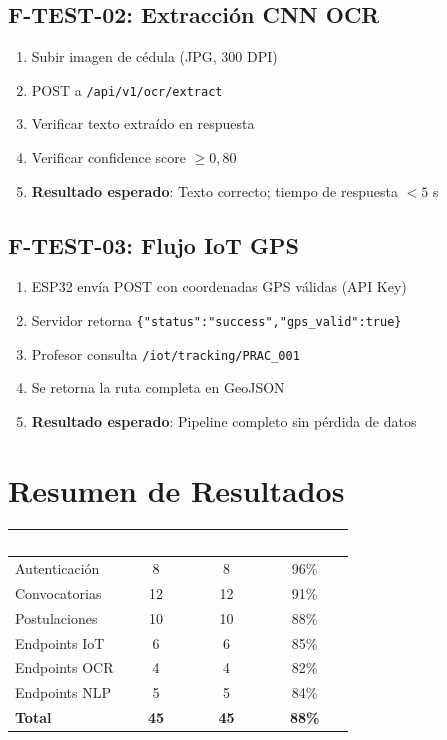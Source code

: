 \documentclass[12pt,a4paper,twoside]{report}
\begin{document}
\subsection{F-TEST-02: Extracción CNN OCR}
\begin{enumerate}[leftmargin=*]
\item Subir imagen de cédula (JPG, 300 DPI)
\item POST a \texttt{/api/v1/ocr/extract}
\item Verificar texto extraído en respuesta
\item Verificar confidence score $\geq 0{,}80$
\item \textbf{Resultado esperado}: Texto correcto; tiempo de respuesta $< 5$ s
\end{enumerate}

\subsection{F-TEST-03: Flujo IoT GPS}
\begin{enumerate}[leftmargin=*]
\item ESP32 envía POST con coordenadas GPS válidas (API Key)
\item Servidor retorna \texttt{\{"status":"success","gps\_valid":true\}}
\item Profesor consulta \texttt{/iot/tracking/PRAC\_001}
\item Se retorna la ruta completa en GeoJSON
\item \textbf{Resultado esperado}: Pipeline completo sin pérdida de datos
\end{enumerate}

\section{Resumen de Resultados}
\begin{center}
\begin{tabularx}{\textwidth}{|l|c|c|c|}
\hline
\rowcolor{tableHdr}
\textcolor{white}{\textbf{Módulo}} & \textcolor{white}{\textbf{Pruebas}} &
\textcolor{white}{\textbf{Pasadas}} & \textcolor{white}{\textbf{Cobertura}} \\
\hline
\rowcolor{rowOdd}Autenticación & 8 & 8 & 96\% \\
\hline\rowcolor{rowEven}Convocatorias & 12 & 12 & 91\% \\
\hline\rowcolor{rowOdd}Postulaciones & 10 & 10 & 88\% \\
\hline\rowcolor{rowEven}Endpoints IoT & 6 & 6 & 85\% \\
\hline\rowcolor{rowOdd}Endpoints OCR & 4 & 4 & 82\% \\
\hline\rowcolor{rowEven}Endpoints NLP & 5 & 5 & 84\% \\
\hline\rowcolor{rowOdd}\textbf{Total} & \textbf{45} & \textbf{45} & \textbf{88\%} \\
\hline
\end{tabularx}
\end{center}
\end{document}
